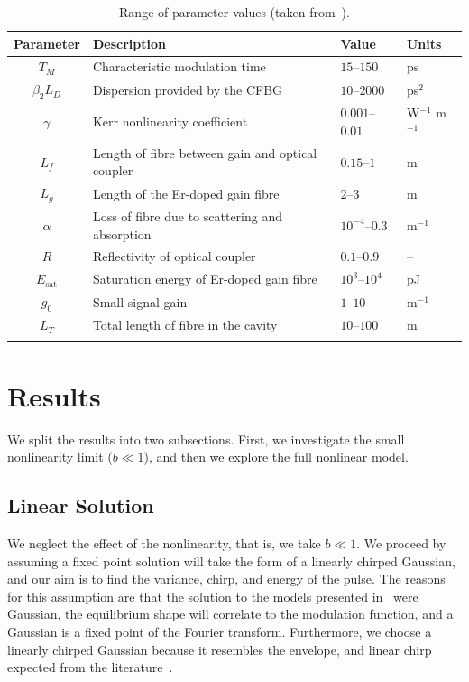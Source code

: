 \documentclass[9pt,twocolumn,twoside]{osajnl}
\newcommand{\Es}{E_{\textrm{sat}}} %
\begin{document}
\begin{table}[tbp]
	\centering
	\caption{Range of parameter values (taken from~\cite{agrawal2013, burgoyne2014, burgoyneemail, tamura1996, usechak2005}).}
 	\label{tab:values}
 	\begin{tabular}{clll}
		\hline
		Parameter & Description & Value & Units \\
		\hline\noalign{\smallskip}
		$T_M$ & Characteristic modulation time & $15$--$150$ & ps \\
		$\beta_2 L_D$ & Dispersion provided by the CFBG & $10$--$2000$ & ps$^2$ \\
		$\gamma$ & Kerr nonlinearity coefficient & $0.001$--$0.01$ & W$^{-1}$ m$^{-1}$ \\
		$L_f$ & Length of fibre between gain and optical coupler & $0.15$--$1$ & m \\
		$L_g$ & Length of the Er-doped gain fibre & $2$--$3$ & m \\
		$\alpha$ & Loss of fibre due to scattering and absorption & $10^{-4}$--$0.3$ & m$^{-1}$ \\
		$R$ & Reflectivity of optical coupler & $0.1$--$0.9$ & -- \\
		$\Es$ & Saturation energy of Er-doped gain fibre & $10^3$--$10^4$ & pJ \\
		$g_0$ & Small signal gain &  $1$--$10$ & m$^{-1}$ \\
		$L_T$ & Total length of fibre in the cavity & $10$--$100$ & m \\
		\noalign{\smallskip}\hline
	\end{tabular}
\end{table}

\section{Results}
\label{sec:results}
We split the results into two subsections. First, we investigate the small nonlinearity limit ($b \ll 1$), and then we explore the full nonlinear model.

\subsection{Linear Solution}
We neglect the effect of the nonlinearity, that is, we take $b \ll 1$. We proceed by assuming a fixed point solution will take the form of a linearly chirped Gaussian, and our aim is to find the variance, chirp, and energy of the pulse. The reasons for this assumption are that the solution to the models presented in~\cite{cutler1955, siegman1969, kuizenga1970a, martinez1984, martinez1985} were Gaussian, the equilibrium shape will correlate to the modulation function, and a Gaussian is a fixed point of the Fourier transform. Furthermore, we choose a linearly chirped Gaussian because it resembles the envelope, and linear chirp expected from the literature~\cite{burgoyne2014, haus1975, haus1996, haus2000, usechak2005}.
\end{document}
